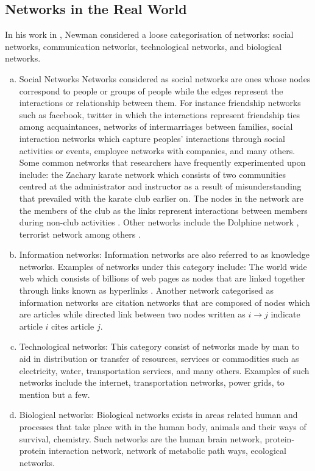 \documentclass[10pt,a4paper]{article}
\begin{document}
	\subsection{Networks in the Real World}
	In his work in \citep{newman2003structure}, Newman considered a loose categorisation of networks: social networks, communication networks, technological networks, and biological networks.
	\begin{enumerate}[a.]
		\item Social Networks
		Networks considered as social networks are ones whose nodes correspond to people or groups of people while the edges represent the interactions or relationship between them. For instance friendship networks such as facebook, twitter in which the interactions represent friendship ties among acquaintances, networks of intermarriages between families, social interaction networks which capture peoples' interactions through social activities or events, employee networks with companies, and many others.
		Some common networks that researchers have frequently experimented upon include: the Zachary karate network which consists of two communities centred at the administrator and instructor as a result of misunderstanding that prevailed with the karate club earlier on. The nodes in the network are the members of the club as the links represent interactions between members during non-club activities \citep{zachary1977information}. Other networks include the Dolphine network \citep{williams1993abundance}, terrorist network\citep{magouirk2008connecting} among others .
		
		\item Information networks: 
		Information networks are also referred to as knowledge networks. Examples of networks under this category include: 
		The world wide web which consists of billions of web pages as nodes that are linked together through links known as hyperlinks \citep{huberman2001laws}.
		Another network categorised as information networks are citation networks that are composed of nodes which are articles while directed link between two nodes written as $i\longrightarrow j$ indicate article $i$ cites article $j$.
		\item Technological networks: 
		This category consist of networks made by man to aid in distribution or transfer of resources, services or commodities such as electricity, water, transportation services, and many others. Examples of such networks include the internet, transportation networks, power grids, to mention but a few.
		\item Biological networks: 
		Biological networks exists in areas related human and processes that take place with in the human body, animals and their ways of survival, chemistry. Such networks are the human brain network, protein-protein interaction network, network of metabolic path ways, ecological networks.
	\end{enumerate}
\end{document}
